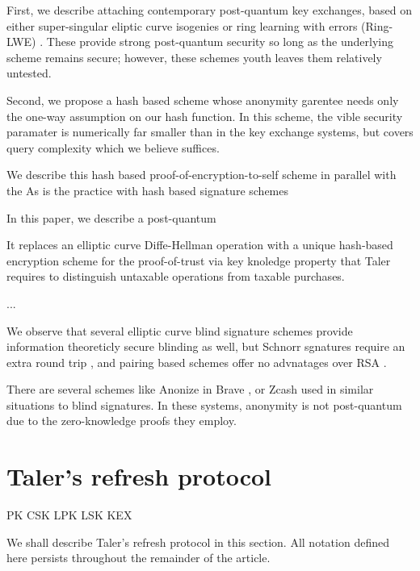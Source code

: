 \documentclass{llncs}
\begin{document}
First, we describe attaching contemporary post-quantum key exchanges,
based on either super-singular eliptic curve isogenies \cite{SIDH} or
ring learning with errors (Ring-LWE) \cite{Peikert14,NewHope}.
These provide strong post-quantum security so long as the underlying
scheme remains secure; however, these schemes youth leaves them
relatively untested.

Second, we propose a hash based scheme whose anonymity garentee needs
only the one-way assumption on our hash function.  In this scheme,
the vible security paramater is numerically far smaller than in the
key exchange systems, but covers query complexity which we believe
suffices.

We describe this hash based proof-of-encryption-to-self scheme in
parallel with the 
As is the practice with hash based signature schemes 




In this paper, we describe a post-quantum 

It replaces an elliptic curve Diffe-Hellman operation with a unique
hash-based encryption scheme for the proof-of-trust via key knoledge
property that Taler requires to distinguish untaxable operations from
taxable purchases. 

...

\smallskip

We observe that several elliptic curve blind signature schemes provide
information theoreticly secure blinding as well, but 
 Schnorr sgnatures require an extra round trip \cite{??}, and
 pairing based schemes offer no advnatages over RSA \cite{??}.

There are several schemes like Anonize \cite{} in Brave \cite{}, 
or Zcash \cite{} used in similar situations to blind signatures. 
In these systems, anonymity is not post-quantum due to the zero-knowledge
proofs they employ.


\section{Taler's refresh protocol}

\def\Mu{M}
\def\Eta{}
\def\newmathrm#1{\expandafter\newcommand\csname #1\endcsname{\mathrm{#1}}}
\newmathrm{CPK}
\newmathrm{CSK}
\newmathrm{LPK}
\newmathrm{LSK}
\newmathrm{KEX}


We shall describe Taler's refresh protocol in this section.
All notation defined here persists throughout the remainder of
 the article.
\end{document}
